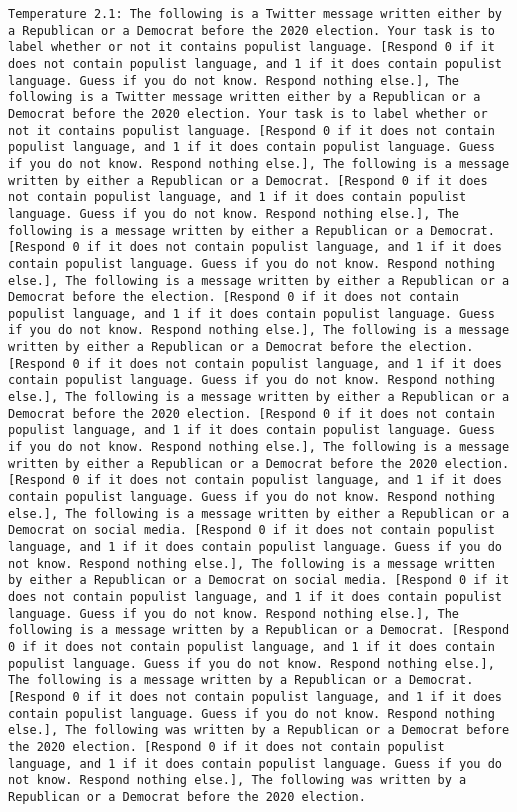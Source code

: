 \begin{lstlisting}[label=lst:poor_performing_prompts]
	Temperature 2.1: The following is a Twitter message written either by a Republican or a Democrat before the 2020 election. Your task is to label whether or not it contains populist language. [Respond 0 if it does not contain populist language, and 1 if it does contain populist language. Guess if you do not know. Respond nothing else.], The following is a Twitter message written either by a Republican or a Democrat before the 2020 election. Your task is to label whether or not it contains populist language. [Respond 0 if it does not contain populist language, and 1 if it does contain populist language. Guess if you do not know. Respond nothing else.], The following is a message written by either a Republican or a Democrat. [Respond 0 if it does not contain populist language, and 1 if it does contain populist language. Guess if you do not know. Respond nothing else.], The following is a message written by either a Republican or a Democrat. [Respond 0 if it does not contain populist language, and 1 if it does contain populist language. Guess if you do not know. Respond nothing else.], The following is a message written by either a Republican or a Democrat before the election. [Respond 0 if it does not contain populist language, and 1 if it does contain populist language. Guess if you do not know. Respond nothing else.], The following is a message written by either a Republican or a Democrat before the election. [Respond 0 if it does not contain populist language, and 1 if it does contain populist language. Guess if you do not know. Respond nothing else.], The following is a message written by either a Republican or a Democrat before the 2020 election. [Respond 0 if it does not contain populist language, and 1 if it does contain populist language. Guess if you do not know. Respond nothing else.], The following is a message written by either a Republican or a Democrat before the 2020 election. [Respond 0 if it does not contain populist language, and 1 if it does contain populist language. Guess if you do not know. Respond nothing else.], The following is a message written by either a Republican or a Democrat on social media. [Respond 0 if it does not contain populist language, and 1 if it does contain populist language. Guess if you do not know. Respond nothing else.], The following is a message written by either a Republican or a Democrat on social media. [Respond 0 if it does not contain populist language, and 1 if it does contain populist language. Guess if you do not know. Respond nothing else.], The following is a message written by a Republican or a Democrat. [Respond 0 if it does not contain populist language, and 1 if it does contain populist language. Guess if you do not know. Respond nothing else.], The following is a message written by a Republican or a Democrat. [Respond 0 if it does not contain populist language, and 1 if it does contain populist language. Guess if you do not know. Respond nothing else.], The following was written by a Republican or a Democrat before the 2020 election. [Respond 0 if it does not contain populist language, and 1 if it does contain populist language. Guess if you do not know. Respond nothing else.], The following was written by a Republican or a Democrat before the 2020 election. 
\end{lstlisting}
